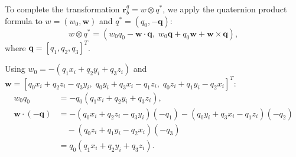 

To complete the transformation $\bm{r}_b^q = w \otimes q^*$, we apply the quaternion product formula to $w = (w_0, \bm{w})$ and $q^* = (q_0, -\bm{q})$:
\begin{equation}
w \otimes q^* = (w_0 q_0 - \bm{w} \cdot \bm{q}, \; w_0\bm{q} + q_0\bm{w} + \bm{w} \times \bm{q}),
\label{eqn:final_product}
\end{equation}
where $\bm{q} = [q_1, q_2, q_3]^T$.


Using $w_0 = -(q_1 x_i + q_2 y_i + q_3 z_i)$ and $\bm{w} = [q_0 x_i + q_2 z_i - q_3 y_i, \; q_0 y_i + q_3 x_i - q_1 z_i, \; q_0 z_i + q_1 y_i - q_2 x_i]^T$:
\begin{align}
w_0 q_0 &= -q_0(q_1 x_i + q_2 y_i + q_3 z_i), \\
\bm{w} \cdot (-\bm{q}) &= -(q_0 x_i + q_2 z_i - q_3 y_i)(-q_1) - (q_0 y_i + q_3 x_i - q_1 z_i)(-q_2) \nonumber \\
&\quad - (q_0 z_i + q_1 y_i - q_2 x_i)(-q_3) \nonumber \\
&= q_0(q_1 x_i + q_2 y_i + q_3 z_i).
\end{align}

